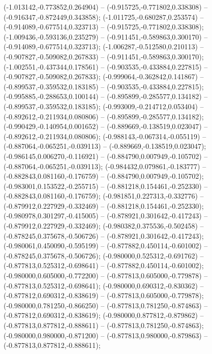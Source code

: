  (-1.013142,-0.773852,0.264904) -- (-0.915725,-0.771802,0.338308) -- (-0.916347,-0.872449,0.343858);
 (-1.011725,-0.680287,0.253574) -- (-0.914089,-0.677514,0.323713) -- (-0.915725,-0.771802,0.338308);
 (-1.009436,-0.593136,0.235279) -- (-0.911451,-0.589863,0.300170) -- (-0.914089,-0.677514,0.323713);
 (-1.006287,-0.512580,0.210113) -- (-0.907827,-0.509082,0.267833) -- (-0.911451,-0.589863,0.300170);
 (-1.002551,-0.437344,0.178561) -- (-0.903535,-0.433884,0.227815) -- (-0.907827,-0.509082,0.267833);
 (-0.999064,-0.362842,0.141867) -- (-0.899537,-0.359532,0.183185) -- (-0.903535,-0.433884,0.227815);
 (-0.995885,-0.288653,0.100144) -- (-0.895899,-0.285577,0.134182) -- (-0.899537,-0.359532,0.183185);
 (-0.993009,-0.214712,0.053404) -- (-0.892612,-0.211934,0.080806) -- (-0.895899,-0.285577,0.134182);
 (-0.990429,-0.140954,0.001652) -- (-0.889669,-0.138519,0.023047) -- (-0.892612,-0.211934,0.080806);
 (-0.988143,-0.067314,-0.055119) -- (-0.887064,-0.065251,-0.039113) -- (-0.889669,-0.138519,0.023047);
 (-0.986145,0.006270,-0.116921) -- (-0.884790,0.007949,-0.105702) -- (-0.887064,-0.065251,-0.039113);
 (-0.984432,0.079861,-0.183777) -- (-0.882843,0.081160,-0.176759) -- (-0.884790,0.007949,-0.105702);
 (-0.983001,0.153522,-0.255715) -- (-0.881218,0.154461,-0.252330) -- (-0.882843,0.081160,-0.176759);
 (-0.981851,0.227313,-0.332776) -- (-0.879912,0.227929,-0.332469) -- (-0.881218,0.154461,-0.252330);
 (-0.980978,0.301297,-0.415005) -- (-0.878921,0.301642,-0.417243) -- (-0.879912,0.227929,-0.332469);
 (-0.980382,0.375536,-0.502458) -- (-0.878245,0.375678,-0.506726) -- (-0.878921,0.301642,-0.417243);
 (-0.980061,0.450090,-0.595199) -- (-0.877882,0.450114,-0.601002) -- (-0.878245,0.375678,-0.506726);
 (-0.980000,0.525312,-0.691762) -- (-0.877813,0.525312,-0.698641) -- (-0.877882,0.450114,-0.601002);
 (-0.980000,0.605000,-0.772200) -- (-0.877813,0.605000,-0.779878) -- (-0.877813,0.525312,-0.698641);
 (-0.980000,0.690312,-0.830362) -- (-0.877812,0.690312,-0.838619) -- (-0.877813,0.605000,-0.779878);
 (-0.980000,0.781250,-0.866250) -- (-0.877813,0.781250,-0.874863) -- (-0.877812,0.690312,-0.838619);
 (-0.980000,0.877812,-0.879862) -- (-0.877813,0.877812,-0.888611) -- (-0.877813,0.781250,-0.874863);
 (-0.980000,0.980000,-0.871200) -- (-0.877813,0.980000,-0.879863) -- (-0.877813,0.877812,-0.888611);
